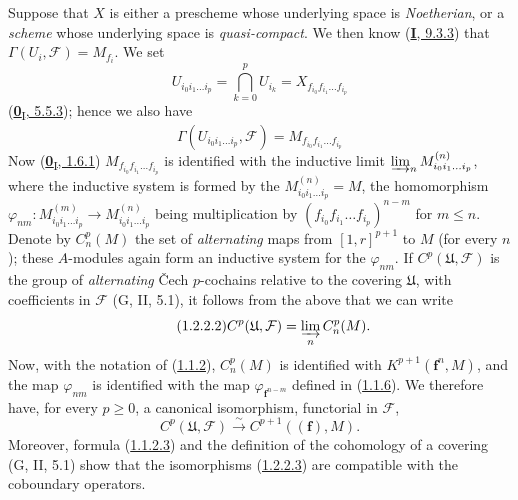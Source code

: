 \begin{env}[1.2.2]
\label{III.1.2.2}
Suppose that $X$ is either a prescheme whose underlying space is
\emph{Noetherian}, or a \emph{scheme} whose underlying space is
\emph{quasi-compact}. We then know (\hyperref[I.9.3.3]{\textbf{I}, 9.3.3}) that
$\Gamma(U_i,\mathcal F)=M_{f_i}$. We set
\[
U_{i_0i_1\ldots i_p}=\bigcap_{k=0}^p U_{i_k}
=X_{f_{i_0}f_{i_1}\ldots f_{i_p}}
\]
(\hyperref[0.5.5.3]{\textbf{0}\textsubscript{I}, 5.5.3}); hence we also have
\begin{equation}
\label{III.1.2.2.1}
\tag{1.2.2.1}
\Gamma(U_{i_0i_1\ldots i_p},\mathcal F)=M_{f_{i_0}f_{i_1}\ldots f_{i_p}}
\end{equation}
Now (\hyperref[0.1.6.1]{\textbf{0}\textsubscript{I}, 1.6.1})
$M_{f_{i_0}f_{i_1}\ldots f_{i_p}}$ is identified with the inductive limit
$\varinjlim_n M_{i_0i_1\ldots i_p}^{(n)}$, where the inductive system is
formed by the $M_{i_0i_1\ldots i_p}^{(n)}=M$, the homomorphism
$\varphi_{nm}:M_{i_0i_1\ldots i_p}^{(m)}\to
M_{i_0i_1\ldots i_p}^{(n)}$ being multiplication by
$(f_{i_0}f_{i_1}\ldots f_{i_p})^{n-m}$ for $m\leq n$. Denote by
$C_n^p(M)$ the set of \emph{alternating} maps from $[1,r]^{p+1}$
to $M$ (for every $n$); these $A$-modules again form an inductive system
for the $\varphi_{nm}$. If $C^p(\mathfrak U,\mathcal F)$ is the group of
\emph{alternating} Čech $p$-cochains relative to the covering $\mathfrak U$,
with coefficients in $\mathcal F$ (G, II, 5.1), it follows from the above
that we can write
\begin{equation}
\label{III.1.2.2.2}
\tag{1.2.2.2}
C^p(\mathfrak U,\mathcal F)=\varinjlim_n C_n^p(M).
\end{equation}
Now, with the notation of (\hyperref[III.1.1.2]{1.1.2}), $C_n^p(M)$
is identified with $K^{p+1}(\mathbf f^n,M)$, and the map $\varphi_{nm}$
is identified with the map $\varphi_{\mathbf f^{n-m}}$ defined in
(\hyperref[III.1.1.6]{1.1.6}). We therefore have, for every $p\geq0$, a
canonical isomorphism, functorial in $\mathcal F$,
\begin{equation}
\label{III.1.2.2.3}
\tag{1.2.2.3}
C^p(\mathfrak U,\mathcal F)\xrightarrow{\sim}C^{p+1}((\mathbf f),M).
\end{equation}
Moreover, formula (\hyperref[III.1.1.2.3]{1.1.2.3}) and the definition of
the cohomology of a covering (G, II, 5.1) show that the isomorphisms
(\hyperref[III.1.2.2.3]{1.2.2.3}) are compatible with the coboundary
operators.
\end{env}

